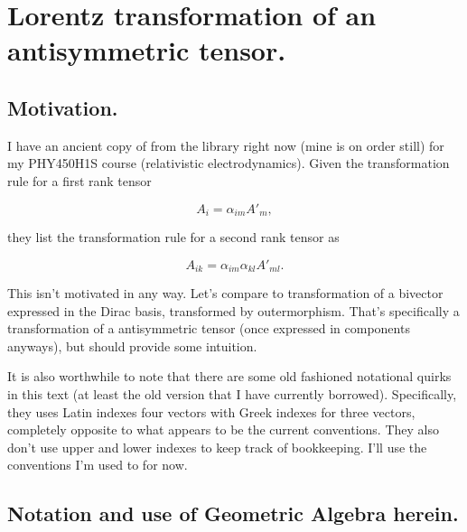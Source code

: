 
%

\chapter{Lorentz transformation of an antisymmetric tensor.}
\label{chap:antisymmetricTensorTx}
{}
\date{Jan 14, 2011}

\beginArtNoToc

\section{Motivation.}

I have an ancient copy of \cite{landau1980classical} from the library right now (mine is on order still) for my PHY450H1S course (relativistic electrodynamics).  Given the transformation rule for a first rank tensor

\begin{equation}\label{eqn:antisymmetricTensorTx:5}
A_{i} = \alpha_{im} A'_{m},
\end{equation}

they list the transformation rule for a second rank tensor as

\begin{equation}\label{eqn:antisymmetricTensorTx:10}
A_{ik} = \alpha_{im} \alpha_{kl} A'_{ml}.
\end{equation}

This isn't motivated in any way.  Let's compare to transformation of a bivector expressed in the Dirac basis, transformed by outermorphism.  That's specifically a transformation of a antisymmetric tensor (once expressed in components anyways), but should provide some intuition.

It is also worthwhile to note that there are some old fashioned notational quirks in this text (at least the old version that I have currently borrowed).  Specifically, they uses Latin indexes four vectors with Greek indexes for three vectors, completely opposite to what appears to be the current conventions.  They also don't use upper and lower indexes to keep track of bookkeeping.  I'll use the conventions I'm used to for now.

\section{Notation and use of Geometric Algebra herein.}

